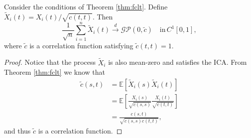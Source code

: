 \begin{corollary}
    Consider the conditions of Theorem  \ref{thm:fclt}. Define $\tilde{X}_i(t)
    = X_i(t) / \sqrt{c(t, t)}$. Then
    \[
        \frac{1}{\sqrt{n}} \sum_{i = 1}^n \tilde{X}_i(t) \overset{d}{\to}
        \mathcal{GP}(0, \tilde{c}) \quad \text{in} \, C^1[0, 1],
    \]
    where $\tilde{c}$ is a correlation function satisfying $\tilde{c}(t, t) = 1$.
\end{corollary}
\begin{proof}
    Notice that the process $\tilde{X}_i$ is also mean-zero and satisfies the ICA. From
    Theorem \ref{thm:fclt} we know that
    \begin{align}
        \tilde{c}(s, t) &= \mathbb{E}[\tilde{X}_i(s)\tilde{X}_i(t)] \\
        &= \mathbb{E}\left[\frac{X_i(s)}{\sqrt{c(s, s)}} \frac{X_i(t)}{\sqrt{c(t, t)}}\right] \\
        &= \frac{c(s, t)}{\sqrt{c(s, s) c(t, t)}},
    \end{align}
    and thus $\tilde{c}$ is a correlation function.
\end{proof}
